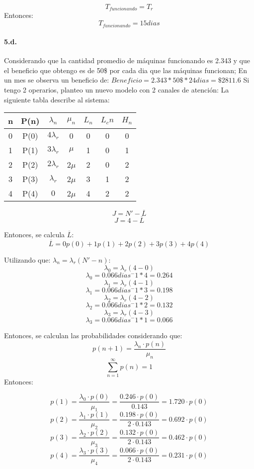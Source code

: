 \documentclass{article}
\begin{document}
$$T_{funcionando} = T_r$$
Entonces:
 $$T_{funcionando} = 15 dias$$
    
\paragraph{5.d.} Considerando que la cantidad promedio de  m\'aquinas funcionando es 2.343 y que el beneficio que obtengo es de 50\$ por cada dia que las m\'aquinas funcionan;
 En un mes se observa un beneficio de: $Beneficio = 2.343 * 50\$ * 24 dias =  \$2811.6 $
Si tengo 2 operarios, planteo un nuevo modelo con 2 canales de atenci\'on:
La siguiente tabla describe al sistema:
    \begin{center}
    \begin{tabular}{|| c | c | c | c | c | c | c ||}
    \hline 
     n & P(n) & $\lambda_n$ & $\mu_n$ & $L_n$& $L_cn$ & $H_n$  \\ \hline \hline
     0 & P(0) & $4\lambda_r$   & 0       & 0    & 0      & 0  \\ \hline
     1 & P(1) & $3\lambda_r$   & $\mu$   & 1    & 0      & 1  \\ \hline
     2 & P(2) & $2\lambda_r$   & 2$\mu$  & 2    & 0      & 2    	\\ \hline
     3 & P(3) & $\lambda_r$ & 2$\mu$  & 3    & 1      & 2   \\ \hline
     4 & P(4) & $0$       & 2$\mu$  & 4    & 2      & 2       \\ \hline  
    \end{tabular}
    \end{center}
  
$$J = N' - \overline{L}$$
  $$J = 4 - \overline{L} $$

  Entonces, se calcula $\overline{L}$:
  $$\overline{L} = 0 p(0) + 1 p(1) + 2 p(2) + 3 p(3) + 4 p(4) $$

  Utilizando que: $\lambda_n = \lambda_r (N' - n)$:
    $$\lambda_0 = \lambda_r (4 - 0)$$
    $$\lambda_0 = 0.066 dias^-1 * 4 = 0.264 $$
    $$\lambda_1 = \lambda_r (4 - 1)$$
    $$\lambda_1 = 0.066 dias^-1 * 3 = 0.198 $$
    $$\lambda_2 = \lambda_r (4 - 2)$$
    $$\lambda_2 = 0.066 dias^-1 * 2 = 0.132 $$
    $$\lambda_3 = \lambda_r (4 - 3)$$
    $$\lambda_3 = 0.066 dias^-1 * 1 = 0.066 $$
    
  Entonces, se calculan las probabilidades considerando que:
      $$ p(n+1) = \frac{\lambda_n \cdot p(n)}{\mu_n}$$
    $$ \sum _{n=1}^{\infty} {p(n)} = 1$$
  Entonces:

    $$ p(1) = \frac{\lambda_0 \cdot p(0)}{\mu_1} = \frac{0.246 \cdot p(0)}{0.143} = 1.720 \cdot p(0)  $$
    $$ p(2) = \frac{\lambda_1 \cdot p(1)}{\mu_2} = \frac{0.198 \cdot p(0)}{2 \cdot 0.143} = 0.692 \cdot p(0) $$
    $$ p(3) = \frac{\lambda_2 \cdot p(2)}{\mu_3} = \frac{0.132 \cdot p(0)}{2 \cdot 0.143} = 0.462 \cdot p(0)$$
    $$ p(4) = \frac{\lambda_3 \cdot p(3)}{\mu_4} = \frac{0.066 \cdot p(0)}{2 \cdot 0.143} = 0.231 \cdot p(0)$$
\end{document}

